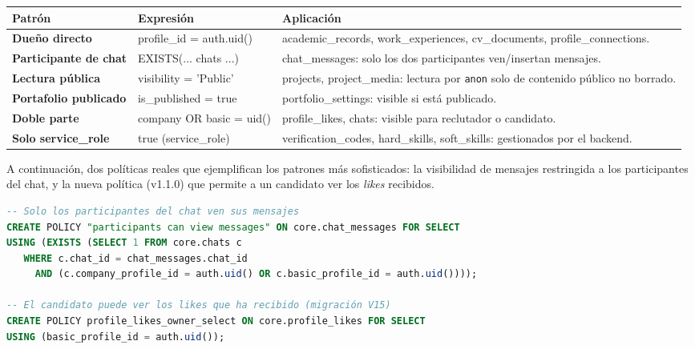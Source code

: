 \vspace{0.2cm}
\noindent
\renewcommand{\arraystretch}{1.3}
\fontsize{8.2}{9.8}\selectfont\sffamily
\begin{tabularx}{\textwidth}{|>{\bfseries\color{colorPrimario}}l|>{\ttfamily\scriptsize}l|X|}
\hline
\rowcolor{headerTabla}
\textbf{Patrón} & \textbf{Expresión} & \textbf{Aplicación} \\
\hline
Dueño directo & profile\_id = auth.uid() & academic\_records, work\_experiences, cv\_documents, profile\_connections. \\
\hline
\rowcolor{grisTecnico}
Participante de chat & EXISTS(... chats ...) & chat\_messages: solo los dos participantes ven/insertan mensajes. \\
\hline
Lectura pública & visibility = 'Public' & projects, project\_media: lectura por \texttt{anon} solo de contenido público no borrado. \\
\hline
\rowcolor{grisTecnico}
Portafolio publicado & is\_published = true & portfolio\_settings: visible si está publicado. \\
\hline
Doble parte & company OR basic = uid() & profile\_likes, chats: visible para reclutador o candidato. \\
\hline
\rowcolor{grisTecnico}
Solo service\_role & true (service\_role) & verification\_codes, hard\_skills, soft\_skills: gestionados por el backend. \\
\hline
\end{tabularx}
\label{tab:patrones-rls}

A continuación, dos políticas reales que ejemplifican los patrones más sofisticados: la
visibilidad de mensajes restringida a los participantes del chat, y la nueva política
(v1.1.0) que permite a un candidato ver los \textit{likes} recibidos.

\begin{lstlisting}[language=SQL, caption={Políticas RLS representativas (esquema \texttt{core}).}]
-- Solo los participantes del chat ven sus mensajes
CREATE POLICY "participants can view messages" ON core.chat_messages FOR SELECT
USING (EXISTS (SELECT 1 FROM core.chats c
   WHERE c.chat_id = chat_messages.chat_id
     AND (c.company_profile_id = auth.uid() OR c.basic_profile_id = auth.uid())));

-- El candidato puede ver los likes que ha recibido (migración V15)
CREATE POLICY profile_likes_owner_select ON core.profile_likes FOR SELECT
USING (basic_profile_id = auth.uid());
\end{lstlisting}

